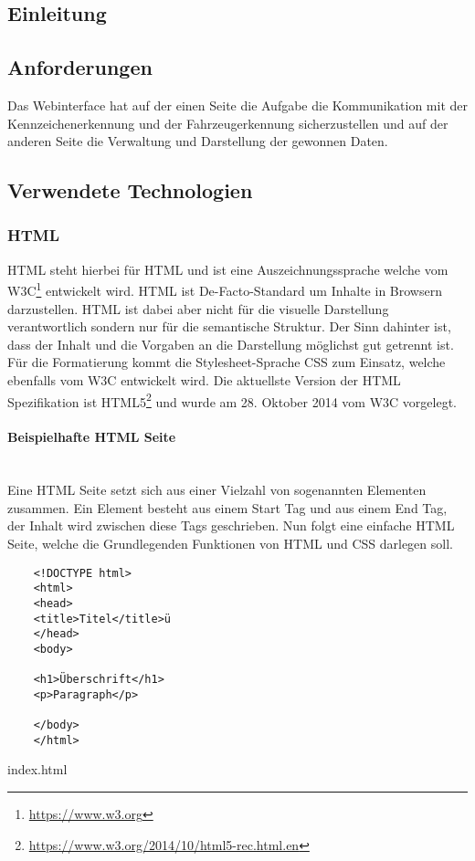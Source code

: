 \def \sectionauthors {Philipp Kraft}

\subsection{Einleitung}

\subsection{Anforderungen}
Das Webinterface hat auf der einen Seite die Aufgabe die Kommunikation mit der
Kennzeichenerkennung und der Fahrzeugerkennung sicherzustellen und auf der
anderen Seite die Verwaltung und Darstellung der gewonnen Daten.

\subsection{Verwendete Technologien}
\subsubsection{HTML}
\acs*{HTML} steht hierbei für \acl*{HTML} und ist eine Auszeichnungssprache
welche vom \ac*{W3C}\footnote{\url{https://www.w3.org} } entwickelt wird. \ac*{HTML} ist
De-Facto-Standard um Inhalte in Browsern darzustellen. \acs*{HTML} ist dabei aber
nicht für die visuelle Darstellung verantwortlich sondern nur für die
semantische Struktur. Der Sinn dahinter ist, dass der Inhalt und die Vorgaben an
die Darstellung möglichst gut getrennt ist. Für die Formatierung kommt die Stylesheet-Sprache \ac*{CSS} zum Einsatz,
welche ebenfalls vom \acl*{W3C} entwickelt wird. Die aktuellste Version der
\acs*{HTML} Spezifikation ist
HTML5\footnote{\url{https://www.w3.org/2014/10/html5-rec.html.en}} und wurde am
28. Oktober 2014 vom \acs*{W3C} vorgelegt.

\paragraph{Beispielhafte HTML Seite}\mbox{}\\
Eine \acs*{HTML} Seite setzt sich aus einer Vielzahl von sogenannten Elementen
zusammen. Ein Element besteht aus einem Start Tag und aus einem End Tag, der
Inhalt wird zwischen diese Tags geschrieben. Nun folgt eine einfache HTML Seite,
welche die Grundlegenden Funktionen von HTML und CSS darlegen soll.

\begin{listing}[H]
  \begin{verbatim}
    <!DOCTYPE html>
    <html>
    <head>
    <title>Titel</title>ü
    </head>
    <body>

    <h1>Überschrift</h1>
    <p>Paragraph</p>

    </body>
    </html>
  \end{verbatim}
  \caption{index.html}
  \label{lst:simple_html_site}
\end{listing}

